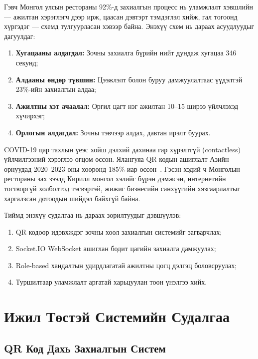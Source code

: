\documentclass[12pt,a4paper]{article}
\begin{document}
Гэвч Монгол улсын рестораны 92\%-д захиалгын процесс нь уламжлалт
хэвшлийн --- ажилтан хэрэглэгч дээр ирж, цаасан дэвтэрт тэмдэглэл
хийж, гал тогоонд хүргэдэг --- схемд тулгуурласан хэвээр байна.
Энэхүү схем нь дараах асуудлуудыг дагуулдаг:

\begin{enumerate}[leftmargin=1.5cm]
  \item \textbf{Хугацааны алдагдал:} Зочны захиалга бүрийн нийт
        дундаж хугацаа 346 секунд;
  \item \textbf{Алдааны өндөр түвшин:} Цээжлэлт болон буруу
        дамжуулалтаас үүдэлтэй 23\%-ийн захиалгын алдаа;
  \item \textbf{Ажилтны хэт ачаалал:} Оргил цагт нэг ажилтан
        10--15 ширээ үйлчлэхэд хүчирхэг;
  \item \textbf{Орлогын алдагдал:} Зочны тэвчээр алдах, давтан
        ирэлт буурах.
\end{enumerate}

COVID-19 цар тахлын үеэс хойш дэлхий дахинаа гар хүрэлтгүй
(contactless) үйлчилгээний хэрэглээ огцом өссөн. Ялангуяа QR кодын
ашиглалт Азийн орнуудад 2020--2023 оны хооронд 185\%-иар өссөн~\cite{juniper2023}.
Гэсэн хэдий ч Монголын рестораны зах зээлд Кирилл монгол хэлийг
бүрэн дэмжсэн, интернетийн тогтворгүй холболтод тэсвэртэй,
жижиг бизнесийн санхүүгийн хязгаарлалтыг харгалзсан дотоодын
шийдэл байхгүй байна.

Тиймд энэхүү судалгаа нь дараах зорилтуудыг дэвшүүлэв:
\begin{enumerate}[leftmargin=1.5cm]
  \item QR кодоор идэвхждэг зочны хоол захиалгын системийг загварчлах;
  \item Socket.IO WebSocket ашиглан бодит цагийн захиалга дамжуулах;
  \item Role-based хандалтын удирдлагатай ажилтны цогц дэлгэц боловсруулах;
  \item Туршилтаар уламжлалт аргатай харьцуулан тоон үнэлгээ хийх.
\end{enumerate}

\section{Ижил Төстэй Системийн Судалгаа}
\label{sec:related}

\subsection{QR Код Дахь Захиалгын Систем}
\end{document}

